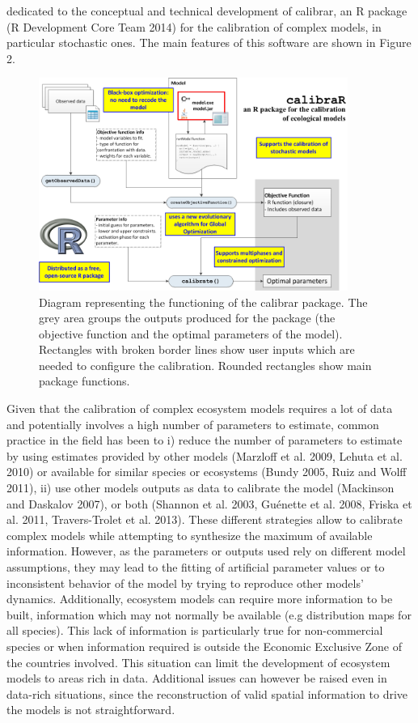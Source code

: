 dedicated to the conceptual and technical development of calibrar, an R package (R Development Core Team 2014) for the calibration of complex models, in particular stochastic ones. The main features of this software are shown in Figure 2.


\begin{figure}[t]
\centering \includegraphics[width=0.9\textwidth]{figures/calibraR}
\caption{Diagram representing the functioning of the calibrar package. The grey area groups the outputs produced for the package (the objective function and the optimal parameters of the model). Rectangles with broken border lines show user inputs which are needed to configure the calibration. Rounded rectangles show main package functions.}
\label{figure-calibrar}
\end{figure}

Given that the calibration of complex ecosystem models requires a lot of data and potentially involves a high number of parameters to estimate, common practice in the field has been to i) reduce the number of parameters to estimate by using estimates provided by other models (Marzloff et al. 2009, Lehuta et al. 2010) or available for similar species or ecosystems (Bundy 2005, Ruiz and Wolff 2011), ii) use other models outputs as data to calibrate the model (Mackinson and Daskalov 2007), or both (Shannon et al. 2003, Guénette et al. 2008, Friska et al. 2011, Travers-Trolet et al. 2013). These different strategies allow to calibrate complex models while attempting to synthesize the maximum of available information. However, as the parameters or outputs used rely on different model assumptions, they may lead to the fitting of artificial parameter values or to inconsistent behavior of the model by trying to reproduce other models' dynamics. Additionally, ecosystem models can require more information to be built, information which may not normally be available (e.g distribution maps for all species). This lack of information is particularly true for non-commercial species or when information required is outside the Economic Exclusive Zone of the countries involved. This situation can limit the development of ecosystem models to areas rich in data. Additional issues can however be raised even in data-rich situations, since the reconstruction of valid spatial information to drive the models is not straightforward.

